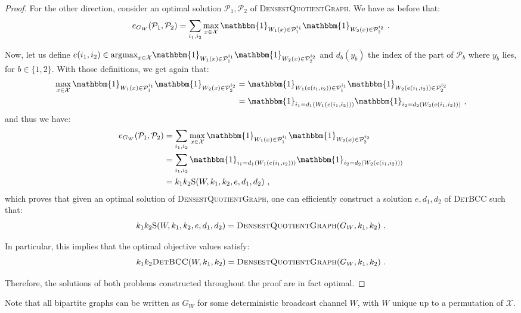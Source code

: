 \begin{proof}
For the other direction, consider an optimal solution $\mathcal{P}_1,\mathcal{P}_2$ of \textsc{DensestQuotientGraph}. We have as before that:
\[ e_{G_W}(\mathcal{P}_1,\mathcal{P}_2) =  \sum_{i_1,i_2} \max_{x \in \mathcal{X}}\mathbbm{1}_{W_1(x) \in \mathcal{P}_1^{i_1}}\mathbbm{1}_{W_2(x) \in \mathcal{P}_2^{i_2}} \ . \]

Now, let us define $e(i_1,i_2) \in \text{argmax}_{x \in \mathcal{X}}\mathbbm{1}_{W_1(x) \in \mathcal{P}_1^{i_1}}\mathbbm{1}_{W_2(x) \in \mathcal{P}_2^{i_2}}$ and $d_b(y_b)$ the index of the part of $\mathcal{P}_b$ where $y_b$ lies, for $b \in \{1,2\}$. With those definitions, we get again that:
\begin{equation}
  \begin{aligned}
    \max_{x \in \mathcal{X}}\mathbbm{1}_{W_1(x) \in \mathcal{P}_1^{i_1}}\mathbbm{1}_{W_2(x) \in \mathcal{P}_2^{i_2}} &= \mathbbm{1}_{W_1(e(i_1,i_2)) \in \mathcal{P}_1^{i_1}}\mathbbm{1}_{W_2(e(i_1,i_2)) \in \mathcal{P}_2^{i_2}}\\
    &= \mathbbm{1}_{i_1=d_1(W_1(e(i_1,i_2)))}\mathbbm{1}_{i_2=d_2(W_2(e(i_1,i_2)))} \ ,
    \end{aligned}
\end{equation}
and thus we have:
\begin{equation}
  \begin{aligned}
e_{G_W}(\mathcal{P}_1,\mathcal{P}_2) &=  \sum_{i_1,i_2} \max_{x \in \mathcal{X}}\mathbbm{1}_{W_1(x) \in \mathcal{P}_1^{i_1}}\mathbbm{1}_{W_2(x) \in \mathcal{P}_2^{i_2}}\\
&= \sum_{i_1,i_2} \mathbbm{1}_{i_1=d_1(W_1(e(i_1,i_2)))}\mathbbm{1}_{i_2=d_2(W_2(e(i_1,i_2)))}\\
&= k_1k_2\mathrm{S}(W,k_1,k_2,e,d_1,d_2) \ ,
    \end{aligned}
\end{equation}
which proves that given an optimal solution of \textsc{DensestQuotientGraph}, one can efficiently construct a solution $e,d_1,d_2$ of \textsc{DetBCC} such that:
\[ k_1k_2\mathrm{S}(W,k_1,k_2,e,d_1,d_2) = \textsc{DensestQuotientGraph}(G_W,k_1,k_2) \ . \]

In particular, this implies that the optimal objective values satisfy:
\[ k_1k_2\textsc{DetBCC}(W,k_1,k_2) = \textsc{DensestQuotientGraph}(G_W,k_1,k_2) \ .\]

Therefore, the solutions of both problems constructed throughout the proof are in fact optimal.
\end{proof}

\begin{rk}
  Note that all bipartite graphs can be written as $G_W$ for some deterministic broadcast channel $W$, with $W$ unique up to a permutation of $\mathcal{X}$.
\end{rk}
